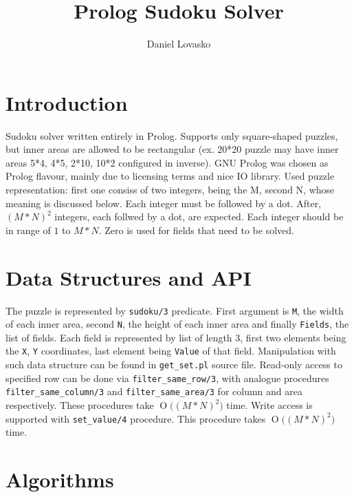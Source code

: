 \documentclass{article}
\newcommand{\BigO}[1]{\ensuremath{\operatorname{O}\bigl(#1\bigr)}}
\begin{document}
	\title{Prolog Sudoku Solver}
	\author{Daniel Lovasko}
	\date{}
	\maketitle
	
	\section*{Introduction}
	Sudoku solver written entirely in Prolog. Supports only square-shaped puzzles, but inner areas are allowed to be rectangular (ex. 20*20 puzzle may have inner areas 5*4, 4*5, 2*10, 10*2 configured in inverse).
	\newline
	\newline
	\indent GNU Prolog was chosen as Prolog flavour, mainly due to licensing terms and nice IO library.
	\newline
	\newline
	\indent Used puzzle representation: first one consiss of two integers, being the M, second N, whose meaning is discussed below. Each integer must be followed by a dot.
	After, $(M*N)^2$ integers, each follwed by a dot, are expected. Each integer should be in range of $1$ to $M*N$. Zero is used for fields that need to be solved.

	\section{Data Structures and API}
	The puzzle is represented by {\tt sudoku/3} predicate. First argument is {\tt M}, the width of each inner area, second {\tt N}, the height of each inner area and finally {\tt Fields}, the list of fields.
	Each field is represented by list of length 3, first two elements being the {\tt X}, {\tt Y} coordinates, last element being {\tt Value} of that field.
	\newline
	\newline
	\indent	Manipulation with such data structure can be found in {\tt get\_set.pl} source file.
	Read-only access to specified row can be done via {\tt filter\_same\_row/3}, with analogue procedures {\tt filter\_same\_column/3} and {\tt filter\_same\_area/3} for column and area respectively. These procedures take \BigO{(M*N)^2} time.
	\newline
	\newline
	\indent	Write access is supported with {\tt set\_value/4} procedure. This procedure takes \BigO{(M*N)^2} time.

	\section{Algorithms}
\end{document}
